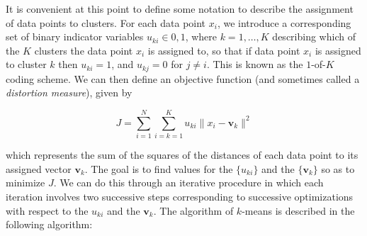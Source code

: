 \documentclass[]{book}
\begin{document}
It is convenient at this point to define some notation to describe the
assignment of data points to clusters. For each data point \(x_i\), we
introduce a corresponding set of binary indicator variables
\(u_{ki} \in {0,1}\), where \(k=1,\ldots,K\) describing which of the
\(K\) clusters the data point \(x_i\) is assigned to, so that if data
point \(x_i\) is assigned to cluster \(k\) then \(u_{ki}= 1\), and
\(u_{kj}= 0\) for \(j \neq i\). This is known as the \(1\)-of-\(K\)
coding scheme. We can then define an objective function (and sometimes
called a \emph{distortion measure}), given by

\[J= \sum_{i=1}^{N} \sum_{i=k=1}^{K} u_{ki} \| x_{i}- \mathbf{v}_{k} \|^2\]

which represents the sum of the squares of the distances of each data
point to its assigned vector \(\mathbf{v}_{k}\). The goal is to find
values for the \(\{u_{ki}\}\) and the \(\{\mathbf{v}_{k}\}\) so as to
minimize \(J\). We can do this through an iterative procedure in which
each iteration involves two successive steps corresponding to successive
optimizations with respect to the \(u_{ki}\) and the \(\mathbf{v}_{k}\).
The algorithm of \(k\)-means is described in the following algorithm:
\end{document}
